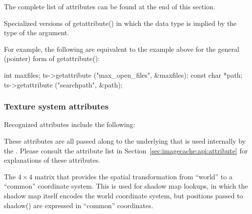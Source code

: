 The complete list of attributes can be found at the end of this section.


\apiend

Specialized versions of {\cf getattribute()} in which the data type is
implied by the type of the argument.

For example, the following are equivalent to the example above for the
general (pointer) form of {\cf getattribute()}:

\begin{code}
      int maxfiles;
      ts->getattribute ("max_open_files", &maxfiles);
      const char *path;
      ts->getattribute ("searchpath", &path);
\end{code}

\apiend


\subsubsection*{Texture system attributes}

Recognized attributes include the following:


These attributes are all passed along to the underlying \ImageCache that
is used internally by the \TextureSystem.  Please consult the
\ImageCache attribute list in Section~\ref{sec:imagecache:api:attribute}
for explanations of these attributes.

\apiend

The $4 \times 4$ matrix that provides the spatial transformation
from ``world'' to a ``common'' coordinate system.  This is used for
shadow map lookups, in which the shadow map itself encodes the
world coordinate system, but positions passed to {\cf shadow()} are
expressed in ``common'' coordinates.
\apiend

